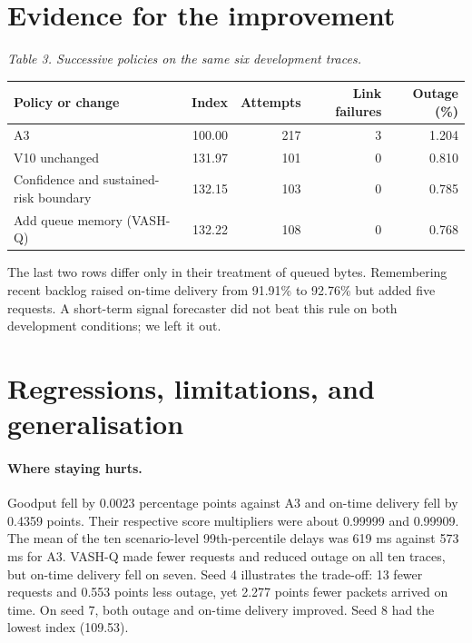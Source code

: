 \documentclass[11pt,a4paper]{article}
\newcommand{\capline}[1]{\par\smallskip\textit{#1}\par}
\begin{document}
\section{Evidence for the improvement}
\capline{Table 3. Successive policies on the same six development traces.}
\begin{center}\begin{tabular}{lrrrr}\toprule
Policy or change&Index&Attempts&Link failures&Outage (\%)\\\midrule
A3&100.00&217&3&1.204\\
V10 unchanged&131.97&101&0&0.810\\
Confidence and sustained-risk boundary&132.15&103&0&0.785\\
Add queue memory (VASH-Q)&132.22&108&0&0.768\\\bottomrule
\end{tabular}\end{center}
The last two rows differ only in their treatment of queued bytes. Remembering recent backlog raised on-time delivery from 91.91\% to 92.76\% but added five requests. A short-term signal forecaster did not beat this rule on both development conditions; we left it out.
\newpage
\section{Regressions, limitations, and generalisation}
\paragraph{Where staying hurts.}
Goodput fell by 0.0023 percentage points against A3 and on-time delivery fell by 0.4359 points. Their respective score multipliers were about 0.99999 and 0.99909. The mean of the ten scenario-level 99th-percentile delays was 619 ms against 573 ms for A3. VASH-Q made fewer requests and reduced outage on all ten traces, but on-time delivery fell on seven. Seed 4 illustrates the trade-off: 13 fewer requests and 0.553 points less outage, yet 2.277 points fewer packets arrived on time. On seed 7, both outage and on-time delivery improved. Seed 8 had the lowest index (109.53).
\end{document}
